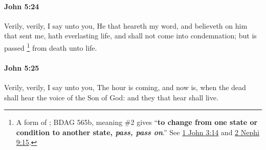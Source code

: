 		\paragraph{John 5:24} %
			\label{JOHN-5-24}

			Verily, verily, I say unto you, He that heareth my word, and believeth on him that sent me, hath everlasting life, and shall not come into condemnation; but is passed%
				\footnote{%
					A form of ; BDAG 565b, meaning \#2 gives ``\textbf{to change from one state or condition to another state, \textit{pass, pass on}}.'' See \hyperref[1JOHN-3-14]{1 John 3:14} and \hyperref[2NEPHI-9-15]{2 Nephi 9:15}.
					}
			from death unto life.

			\begin{framed}
			\scriptsize
				\begin{compactdesc}
					\item[SBLG] 
				\end{compactdesc}
			\end{framed}

		\paragraph{John 5:25} %
			\label{JOHN-5-25}

			Verily, verily, I say unto you, The hour is coming, and now is, when the dead shall hear the voice of the Son of God: and they that hear shall live.

